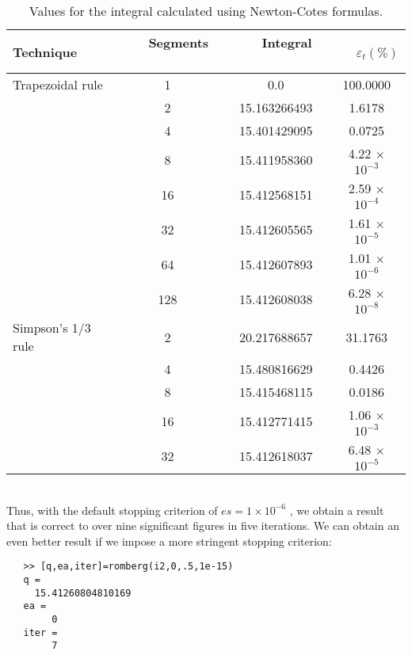 \begin{table}[hbt!]
\caption{\textsf{Values for the integral calculated using Newton-Cotes
formulas. }}
\centering
\begin{tabular}{lccc}
	\hline
	\textbf{Technique} \ \ \ & \ \ \ \textbf{Segments} \ \ \  & \ \ \  \textbf{Integral} \ \ \  & \ \ \  \textbf{$\varepsilon_{t}(\%)$}\\ \hline
	
	Trapezoidal rule & 1 & 0.0 & 100.0000\\
	
	\vspace{} & 2 & 15.163266493 & 1.6178\\
	
	\vspace{} & 4 & 15.401429095 & 0.0725\\
	
	\vspace{} & 8 & 15.411958360 &  4.22 × $10^{-3}$\\
	
	\vspace{} & 16 & 15.412568151 & 2.59 × $10^{-4}$\\
	
	\vspace{} & 32 &  15.412605565 & 1.61 × $10^{-5}$\\
	
	\vspace{} & 64 &  15.412607893 &  1.01 × $10^{-6}$\\
	
	\vspace{} & 128 & 15.412608038 & 6.28 × $10^{-8}$\\ \hline
	
	Simpson’s 1/3 rule & 2 & 20.217688657 & 31.1763\\
	
	\vspace{} & 4 & 15.480816629 &  0.4426\\
	
	\vspace{} & 8 & 15.415468115 & 0.0186\\
	
	\vspace{} & 16 & 15.412771415 & 1.06 × $10^{-3}$\\
	
	\vspace{} & 32 & 15.412618037 & 6.48 × $10^{-5}$\\ \hline
\end{tabular}
\end{table}\\
Thus, with the default stopping criterion of $es = 1 × 10^{−6}$
, we obtain a result that is correct
to over nine significant figures in five iterations. We can obtain an even better result if we
impose a more stringent stopping criterion:
\begin{verbatim}
   >> [q,ea,iter]=romberg(i2,0,.5,1e-15)
   q =
     15.41260804810169
   ea =
        0
   iter =
        7
\end{verbatim}

